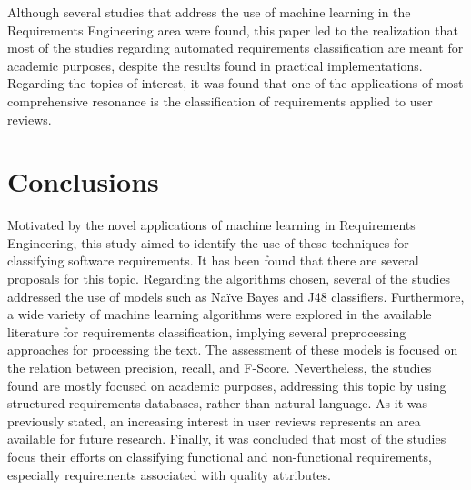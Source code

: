 \documentclass[conference]{IEEEtran}
\begin{document}
Although several studies that address the use of machine learning in the Requirements Engineering area were found, this paper led to the realization that most of the studies regarding automated requirements classification are meant for academic purposes, despite the results found in practical implementations. Regarding the topics of interest, it was found that one of the applications of most comprehensive resonance is the classification of requirements applied to user reviews. 

\section{Conclusions}
\label{conclusions}

Motivated by the novel applications of machine learning in Requirements Engineering, this study aimed to identify the use of these techniques for classifying software requirements. It has been found that there are several proposals for this topic. Regarding the algorithms chosen, several of the studies addressed the use of models such as Naïve Bayes and J48 classifiers. Furthermore, a wide variety of machine learning algorithms were explored in the available literature for requirements classification, implying several preprocessing approaches for processing the text. The assessment of these models is focused on the relation between precision, recall, and F-Score. Nevertheless, the studies found are mostly focused on academic purposes, addressing this topic by using structured requirements databases, rather than natural language. As it was previously stated, an increasing interest in user reviews represents an area available for future research. Finally, it was concluded that most of the studies focus their efforts on classifying functional and non-functional requirements, especially requirements associated with quality attributes.



\end{document}
